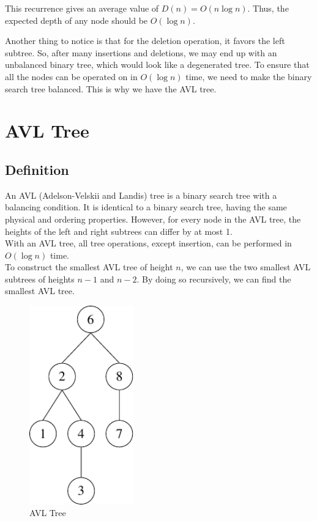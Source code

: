This recurrence gives an average value of \(D(n) = O(n\log n)\). Thus, the expected depth of any node should be \(O(\log n)\).

Another thing to notice is that for the deletion operation, it favors the left subtree. So, after many insertions and deletions, we may end up with an unbalanced binary tree, which would look like a degenerated tree. To ensure that all the nodes can be operated on in \(O(\log n)\) time, we need to make the binary search tree balanced. This is why we have the AVL tree.

\section{AVL Tree}
\subsection{Definition}
\begin{minipage}{0.7\textwidth}
An AVL (Adelson-Velskii and Landis) tree is a binary search tree with a balancing condition. It is identical to a binary search tree, having the same physical and ordering properties. However, for every node in the AVL tree, the heights of the left and right subtrees can differ by at most 1.\\[3pt]
With an AVL tree, all tree operations, except insertion, can be performed in \(O(\log n)\) time.\\[3pt]
To construct the smallest AVL tree of height \(n\), we can use the two smallest AVL subtrees of heights \(n-1\) and \(n-2\). By doing so recursively, we can find the smallest AVL tree.
\end{minipage}
\begin{minipage}{0.3\textwidth}
  \begin{figure}[H]
    \centering
    \includegraphics[width=0.4\textwidth]{Figure/AVL.pdf}
    \caption{AVL Tree}
  \end{figure}
\end{minipage}

